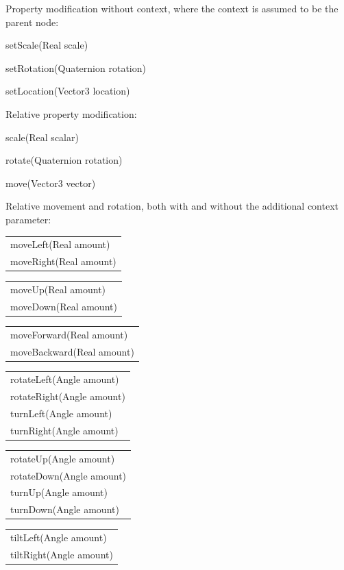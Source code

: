 			\begin{smalllist}
				\item Property modification without context, where the context is assumed to be the parent node:
				\begin{smalllist}
					\item setScale(Real scale)
					\item setRotation(Quaternion rotation)
					\item setLocation(Vector3 location)
				\end{smalllist}
				\item Relative property modification:
				\begin{smalllist}
					\item scale(Real scalar)
					\item rotate(Quaternion rotation)
					\item move(Vector3 vector)
				\end{smalllist}
				\item Relative movement and rotation, both with and without the additional context parameter:
					\begin{smalllist}
						\item \begin{tabular}{|l}
								moveLeft(Real amount) \\ moveRight(Real amount)
							\end{tabular}
						\item \begin{tabular}{|l}
								moveUp(Real amount) \\ moveDown(Real amount)
							\end{tabular}
						\item \begin{tabular}{|l}
								moveForward(Real amount) \\ moveBackward(Real amount)
							\end{tabular}
						\item \begin{tabular}{|l}
								rotateLeft(Angle amount) \\ rotateRight(Angle amount) \\ turnLeft(Angle amount) \\ turnRight(Angle amount)
							\end{tabular}
						\item \begin{tabular}{|l}
								rotateUp(Angle amount) \\ rotateDown(Angle amount) \\ turnUp(Angle amount) \\ turnDown(Angle amount)
							\end{tabular}
						\item \begin{tabular}{|l}
								tiltLeft(Angle amount) \\ tiltRight(Angle amount)
							\end{tabular}
					\end{smalllist}
			\end{smalllist}

